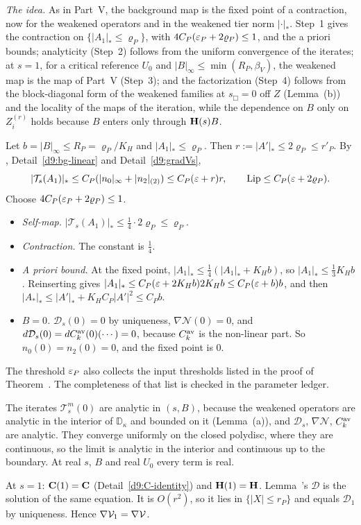 \begin{detail}\label{d9:weak-bg}
\emph{The idea.} As in Part~V, the background map is the fixed point of a contraction, now for the weakened operators and in the weakened tier norm $|\cdot|_*$. Step~1 gives the contraction on $\{|A_1|_*\le\varrho_P\}$, with $4C_P(\varepsilon_P+2\varrho_P)\le1$, and the a priori bounds; analyticity (Step~2) follows from the uniform convergence of the iterates; at $s=1$, for a critical reference $U_0$ and $|B|_\infty\le\min(R_P,\beta_V)$, the weakened map is the map of Part~V (Step~3); and the factorization (Step~4) follows from the block-diagonal form of the weakened families at $s_\Box=0$ off $Z$ (Lemma~(b)) and the locality of the maps of the iteration, while the dependence on $B$ only on $Z_i^{(r)}$ holds because $B$ enters only through $\mathbf H(s)B$.
\begin{step}[(a)]
Let $b=|B|_\infty\le R_P=\varrho_P/K_H$ and $|A_1|_*\le\varrho_P$. Then $r:=|A'|_*\le2\varrho_P\le r'_P$. By , Detail~\ref{d9:bg-linear} and Detail~\ref{d9:gradVs},
\[
|\mathcal T_s(A_1)|_*\le C_P(|n_0|_\infty+|n_2|_{(2)})\le C_P(\varepsilon+r)r,\qquad\operatorname{Lip}\le C_P(\varepsilon+2\varrho_P) .
\]
Choose $4C_P(\varepsilon_P+2\varrho_P)\le1$.
\begin{itemize}
\item \emph{Self-map.} $|\mathcal T_s(A_1)|_*\le\frac14\cdot2\varrho_P\le\varrho_P$.
\item \emph{Contraction.} The constant is $\frac14$.
\item \emph{A priori bound.} At the fixed point, $|A_1|_*\le\frac14(|A_1|_*+K_Hb)$, so $|A_1|_*\le\frac13K_Hb$. Reinserting gives $|A_1|_*\le C_P(\varepsilon+2K_Hb)2K_Hb\le C_P(\varepsilon+b)b$, and then $|A_*|_*\le|A'|_*+K_HC_P|A'|^2\le C_Pb$.
\item \emph{$B=0$.} $\mathcal D_s(0)=0$ by uniqueness, $\nabla\mathcal N(0)=0$, and $d\mathcal D_s(0)=dC^{\rm av}_k(0)(\cdots)=0$, because $C^{\rm av}_k$ is the non-linear part. So $n_0(0)=n_2(0)=0$, and the fixed point is $0$.
\end{itemize}
The threshold $\varepsilon_P$ also collects the input thresholds listed in the proof of Theorem~. The completeness of that list is checked in the parameter ledger.
\end{step}
\begin{step}[(b)]
The iterates $\mathcal T_s^m(0)$ are analytic in $(s,B)$, because the weakened operators are analytic in the interior of $\mathbb D_\kappa$ and bounded on it (Lemma~(a)), and $\mathcal D_s$, $\nabla\mathcal N$, $C^{\rm av}_k$ are analytic. They converge uniformly on the closed polydisc, where they are continuous, so the limit is analytic in the interior and continuous up to the boundary. At real $s$, $B$ and real $U_0$ every term is real.
\end{step}
\begin{step}[(c)]
At $s=1$: $\mathbf C(1)=\mathbf C$ (Detail~\ref{d9:C-identity}) and $\mathbf H(1)=\mathbf H$. Lemma~'s $\mathcal D$ is the solution of the same equation. It is $O(r^2)$, so it lies in $\{|X|\le r_P\}$ and equals $\mathcal D_1$ by uniqueness. Hence $\nabla\mathcal V_1=\nabla\mathcal V$.


\end{step}
\end{detail}
